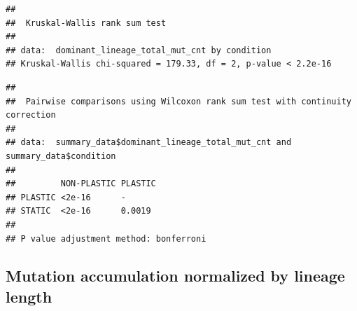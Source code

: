 \documentclass[]{book}
\newenvironment{Shaded}{\begin{snugshade}}{\end{snugshade}}
\newcommand{\DataTypeTok}[1]{\textcolor[rgb]{0.13,0.29,0.53}{#1}}
\newcommand{\KeywordTok}[1]{\textcolor[rgb]{0.13,0.29,0.53}{\textbf{#1}}}
\newcommand{\NormalTok}[1]{#1}
\newcommand{\OperatorTok}[1]{\textcolor[rgb]{0.81,0.36,0.00}{\textbf{#1}}}
\newcommand{\StringTok}[1]{\textcolor[rgb]{0.31,0.60,0.02}{#1}}
\begin{document}
\begin{verbatim}
## 
##  Kruskal-Wallis rank sum test
## 
## data:  dominant_lineage_total_mut_cnt by condition
## Kruskal-Wallis chi-squared = 179.33, df = 2, p-value < 2.2e-16
\end{verbatim}

\begin{Shaded}
\end{Shaded}

\begin{verbatim}
## 
##  Pairwise comparisons using Wilcoxon rank sum test with continuity correction 
## 
## data:  summary_data$dominant_lineage_total_mut_cnt and summary_data$condition 
## 
##         NON-PLASTIC PLASTIC
## PLASTIC <2e-16      -      
## STATIC  <2e-16      0.0019 
## 
## P value adjustment method: bonferroni
\end{verbatim}

\hypertarget{mutation-accumulation-normalized-by-lineage-length}{%
\subsection{Mutation accumulation normalized by lineage length}\label{mutation-accumulation-normalized-by-lineage-length}}
\end{document}
